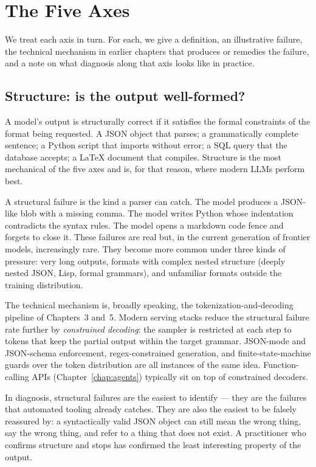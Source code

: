 \section{The Five Axes}

We treat each axis in turn. For each, we give a definition, an
illustrative failure, the technical mechanism in earlier chapters
that produces or remedies the failure, and a note on what diagnosis
along that axis looks like in practice.

\subsection{Structure: is the output well-formed?}

A model's output is structurally correct if it satisfies the formal
constraints of the format being requested. A JSON object that
parses; a grammatically complete sentence; a Python script that
imports without error; a SQL query that the database accepts; a
LaTeX document that compiles. Structure is the most mechanical of
the five axes and is, for that reason, where modern LLMs perform
best.

A structural failure is the kind a parser can catch. The model
produces a JSON-like blob with a missing comma. The model writes
Python whose indentation contradicts the syntax rules. The model
opens a markdown code fence and forgets to close it. These failures
are real but, in the current generation of frontier models,
increasingly rare. They become more common under three kinds of
pressure: very long outputs, formats with complex nested structure
(deeply nested JSON, Lisp, formal grammars), and unfamiliar formats
outside the training distribution.

The technical mechanism is, broadly speaking, the
tokenization-and-decoding pipeline of Chapters~3 and~5. Modern
serving stacks reduce the structural failure rate further by
\emph{constrained decoding}: the sampler is restricted at each step
to tokens that keep the partial output within the target grammar.
JSON-mode and JSON-schema enforcement, regex-constrained generation,
and finite-state-machine guards over the token distribution are all
instances of the same idea. Function-calling APIs (Chapter~\ref{chap:agents})
typically sit on top of constrained decoders.

In diagnosis, structural failures are the easiest to identify ---
they are the failures that automated tooling already catches. They
are also the easiest to be falsely reassured by: a syntactically
valid JSON object can still mean the wrong thing, say the wrong
thing, and refer to a thing that does not exist. A practitioner
who confirms structure and stops has confirmed the least
interesting property of the output.

